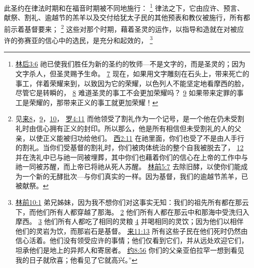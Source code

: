 \documentclass[12pt, a4paper, oneside]{ctexart}
\newcounter{parnum}[section]
\newcommand{\N}{%
   \noindent\refstepcounter{parnum}%
    \makebox[\parindent][l]{\textbf{\arabic{parnum}.}}}
\begin{document}
\N 此圣约在律法时期和在福音时期被不同地施行：
	\footnote {
		\href{https://biblehub.com/2_corinthians/3-6.htm}{林后3:6} 祂已使我们胜任为新的圣约的牧师---不是文字的，而是圣灵的；因为文字杀人，但圣灵赐予生命。
		\href{https://biblehub.com/2_corinthians/3-7.htm}{7} 现在，如果用文字雕刻在石头上，带来死亡的事工，伴着荣耀来到，以致因为它的荣耀，以色列人不能坚定地看摩西的脸，尽管它是转瞬的，
		\href{https://biblehub.com/2_corinthians/3-8.htm}{8} 难道圣灵的事工不会更加荣耀吗？
		\href{https://biblehub.com/2_corinthians/3-9.htm}{9} 如果带来定罪的事工是荣耀的，那带来正义的事工就更加荣耀！
	}
	律法之下，它由应许、预言、献祭、割礼、逾越节的羔羊以及交付给犹太子民的其他预表和教仪被施行，所有都前示着基督要来；
	\footnote {
		见\href{https://biblehub.com/niv/hebrews/8.htm}{来8}，\href{https://biblehub.com/niv/hebrews/9.htm}{9}，\href{https://biblehub.com/niv/hebrews/10.htm}{10}，
		\href{https://biblehub.com/romans/4-11.htm}{罗4:11} 而他领受了割礼作为一个记号，是一个他在仍未受割礼时由信心拥有正义的封印。所以那么，他是所有相信但未受割礼的人的父亲，以使正义能被归功给他们。
		\href{https://biblehub.com/colossians/2-11.htm}{西2:11} 在祂里面，你们也受了不是由人手行的割礼。当你们受基督的割礼时，你们被肉体统治的整个自我被脱去了，
		\href{https://biblehub.com/colossians/2-12.htm}{12} 并在洗礼中已与祂一同被埋葬，其中你们也藉着你们的信心在上帝的工作中与祂一同被苏醒，而上帝已将祂从死人苏醒。
		\href{https://biblehub.com/1_corinthians/5-7.htm}{林前5:7} 去除旧酵，以使你们能成为一个新的无酵批次---与你们真实的一样。因为基督，我们的逾越节羔羊，已被献祭。
	}
	这些对那个时期，藉着圣灵的运作，以指导和造就在对被应许的弥赛亚的信心中的选民，是充分和起效的，
	\footnote {
		\href{https://biblehub.com/1_corinthians/10-1.htm}{林前10:1} 弟兄姊妹，因为我不想你们对这事实无知：我们的祖先所有都在那云下，而他们所有人都穿越了那海。
		\href{https://biblehub.com/1_corinthians/10-2.htm}{2} 他们所有人都在那云中和那海中受洗归入摩西。
		\href{https://biblehub.com/1_corinthians/10-3.htm}{3} 他们所有人都吃了相同的灵粮
		\href{https://biblehub.com/1_corinthians/10-4.htm}{4} 并喝相同的灵饮；因为他们以相伴他们的灵岩为饮，而那岩石是基督。 
		\href{https://biblehub.com/hebrews/11-13.htm}{来11:13} 所有这些子民在他们死时仍然由信心活着。他们没有领受应许的事情；他们仅看到它们，并从远处欢迎它们，坦承他们是地上的异邦人和寄居者。
		\href{https://biblehub.com/john/8-56.htm}{约8:56} 你们的父亲亚伯拉罕一想到看见我的日子就欣喜；他看见了它就高兴。”
	}
\end{document}
